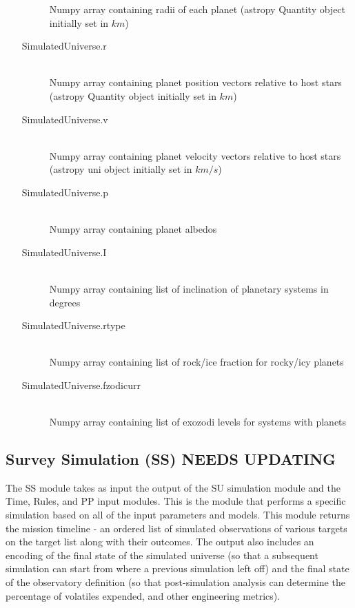 \documentclass[cleanfoot]{asme2ej}
\begin{document}
\begin{itemize}
\begin{description}
        Numpy array containing radii of each planet (astropy Quantity object initially set in $ km $)
        \item[SimulatedUniverse.r] \hfill \\
        Numpy array containing planet position vectors relative to host stars (astropy Quantity object initially set in $ km $)
        \item[SimulatedUniverse.v] \hfill \\
        Numpy array containing planet velocity vectors relative to host stars (astropy uni object initially set in $ km/s $)
        \item[SimulatedUniverse.p] \hfill \\
        Numpy array containing planet albedos
        \item[SimulatedUniverse.I] \hfill \\
        Numpy array containing list of inclination of planetary systems in degrees
        \item[SimulatedUniverse.rtype] \hfill \\
        Numpy array containing list of rock/ice fraction for rocky/icy planets
        \item[SimulatedUniverse.fzodicurr] \hfill \\
        Numpy array containing list of exozodi levels for systems with planets
    \end{description}
\end{itemize}


\subsection{Survey Simulation (SS) NEEDS UPDATING} \label{sec:surveysim}
The SS module takes as input the output of the SU simulation module and the Time, Rules, and PP input modules. This is the module that performs a specific simulation based on all of the input parameters and models. This module returns the mission timeline - an ordered list of simulated observations of various targets on the target list along with their outcomes.  The output also includes an encoding of the final state of the simulated universe (so that a subsequent simulation can start from where a previous simulation left off) and the final state of the observatory definition (so that post-simulation analysis can determine the percentage of volatiles expended, and other engineering metrics).
\end{document}
